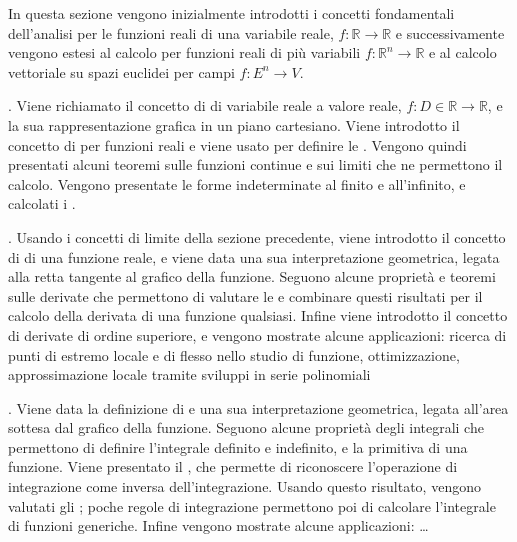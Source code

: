\documentclass[letterpaper,10pt,italian]{jupyterBook}
\begin{document}
\sphinxAtStartPar
In questa sezione vengono inizialmente introdotti i concetti fondamentali dell’analisi per le funzioni reali di una variabile reale, \(f: \mathbb{R} \rightarrow \mathbb{R}\) e successivamente vengono estesi al calcolo per funzioni reali di più variabili \(f: \mathbb{R}^n \rightarrow \mathbb{R}\) e al calcolo vettoriale su spazi euclidei per campi \(f: E^n \rightarrow V\).

\sphinxAtStartPar
{\hyperref[\detokenize{ch/infinitesimal_calculus/analysis:infinitesimal-calculus-analysis}]{}}. Viene richiamato il concetto di  di variabile reale a valore reale, \(f: D \in \mathbb{R} \rightarrow \mathbb{R}\), e la sua rappresentazione grafica in un piano cartesiano. 
Viene introdotto il concetto di  per funzioni reali e viene usato per definire le . Vengono quindi presentati alcuni teoremi sulle funzioni continue e sui limiti che ne permettono il calcolo. Vengono presentate le forme indeterminate al finito e all’infinito, e calcolati i .

\sphinxAtStartPar
{\hyperref[\detokenize{ch/infinitesimal_calculus/derivatives:infinitesimal-calculus-derivatives}]{}}. Usando i concetti di limite della sezione precedente, viene introdotto il concetto di  di una funzione reale, e viene data una sua interpretazione geometrica, legata alla retta tangente al grafico della funzione. Seguono alcune proprietà e teoremi sulle derivate che permettono di valutare le  e combinare questi risultati per il calcolo della derivata di una funzione qualsiasi. Infine viene introdotto il concetto di derivate di ordine superiore, e vengono mostrate alcune applicazioni: ricerca di punti di estremo locale e di flesso nello studio di funzione, ottimizzazione, approssimazione locale tramite sviluppi in serie polinomiali

\sphinxAtStartPar
{\hyperref[\detokenize{ch/infinitesimal_calculus/integrals:infinitesimal-calculus-integrals}]{}}. Viene data la definizione di  e una sua interpretazione geometrica, legata all’area sottesa dal grafico della funzione. Seguono alcune proprietà degli integrali che permettono di definire l’integrale definito e indefinito, e la primitiva di una funzione. Viene presentato il , che permette di riconoscere l’operazione di integrazione come inversa dell’integrazione. Usando questo risultato, vengono valutati gli ; poche regole di integrazione permettono poi di calcolare l’integrale di funzioni generiche. Infine vengono mostrate alcune applicazioni: … 
\end{document}
